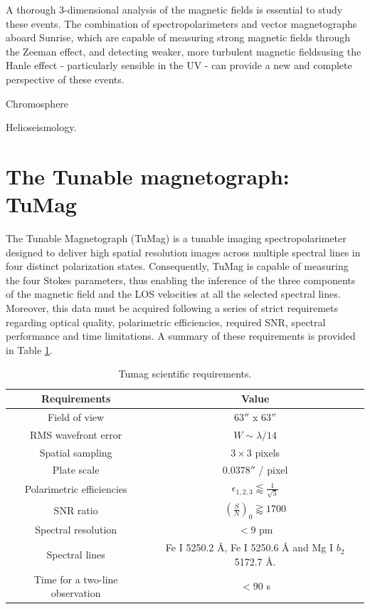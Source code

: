 A thorough 3-dimensional analysis of the magnetic fields is essential to study these events. The combination of spectropolarimeters and vector magnetographs aboard Sunrise, which are capable of measuring strong magnetic fields through the Zeeman effect, and detecting weaker, more turbulent \citep{quiet_sun_living_review} magnetic fieldsusing the Hanle effect - particularly sensible in the UV - can provide a new and complete perspective of these events.  

Chromosphere


Helioseismology. 


\section{The Tunable magnetograph: TuMag}

The Tunable Magnetograph (TuMag) is a tunable imaging spectropolarimeter designed to deliver high spatial resolution images across multiple spectral lines in four distinct polarization states. Consequently, TuMag is capable of measuring the four Stokes parameters, thus enabling the inference of the three components of the magnetic field and the LOS velocities at all the selected spectral lines. Moreover, this data must be acquired following a series of strict requiremets regarding optical quality, polarimetric efficiencies, required SNR, spectral performance and time limitations. A summary of these requirements is provided in Table \ref{table: Tumags requirements}. 

\begin{table}
    \centering
   \begin{tabular}{cc}
    \hline
    \hline
    Requirements & Value \\
    \hline
    Field of view & $63''$ x $63''$ \\
    RMS wavefront error & $W \sim \lambda / 14$\\
    Spatial sampling & $3 \times 3 $ pixels \\
    Plate scale & $0.0378''$ / pixel \\
    Polarimetric efficiencies & $\epsilon _ {1, 2, 3} \lessapprox \frac{1}{\sqrt{3}}$\\
    SNR ratio & $\left(\frac{S}{N}\right) _ 0 \gtrapprox 1700$ \\
    Spectral resolution & $< 9$ pm\\  
    Spectral lines & Fe I 5250.2 \r{A}, Fe I 5250.6 \r{A} and Mg I $b_2$ 5172.7 \r{A}. \\
    Time for a two-line observation & $< 90$ s\\
    \hline
    \hline
    \end{tabular}
    \caption{Tumag scientific requirements.}
    \label{table: Tumags requirements}
\end{table}

